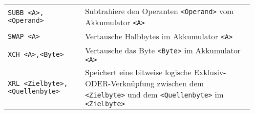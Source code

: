 \begin{longtable}[c]{@{}ll@{}}
\begin{minipage}[t]{0.25\columnwidth}\raggedright\strut
\texttt{SUBB <A>,<Operand>}
\strut\end{minipage} & \begin{minipage}[t]{0.69\columnwidth}\raggedright\strut
Subtrahiere den Operanten \texttt{<Operand>} vom Akkumulator \texttt{<A>}
\strut\end{minipage}\tabularnewline
\begin{minipage}[t]{0.25\columnwidth}\raggedright\strut
\texttt{SWAP <A>}
\strut\end{minipage} & \begin{minipage}[t]{0.69\columnwidth}\raggedright\strut
Vertausche Halbbytes im Akkumulator \texttt{<A>}
\strut\end{minipage}\tabularnewline
\begin{minipage}[t]{0.25\columnwidth}\raggedright\strut
\texttt{XCH <A>,<Byte>}
\strut\end{minipage} & \begin{minipage}[t]{0.69\columnwidth}\raggedright\strut
Vertausche das Byte \texttt{<Byte>} im Akkumulator \texttt{<A>}
\strut\end{minipage}\tabularnewline
\begin{minipage}[t]{0.25\columnwidth}\raggedright\strut
\texttt{XRL <Zielbyte>,} \texttt{<Quellenbyte>}
\strut\end{minipage} & \begin{minipage}[t]{0.69\columnwidth}\raggedright\strut
Speichert eine bitweise logische Exklusiv-ODER-Verknüpfung zwischen dem \texttt{<Zielbyte>} und
dem \texttt{<Quellenbyte>} im \texttt{<Zielbyte>}
\strut\end{minipage}\tabularnewline
\bottomrule
\end{longtable}